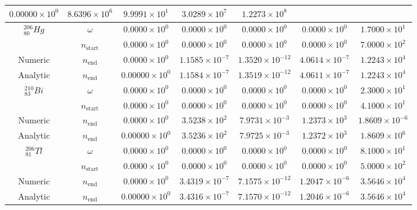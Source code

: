 \begin{table}[h]
\begin{center}
\begin{longtable}{c c c c c c c}
${0.00000} \times 10^{0}$ & ${8.6396} \times 10^{6}$ & ${9.9991} \times 10^{1}$ & 
${3.0289} \times 10^{7}$ & ${1.2273} \times 10^{8}$ \\
\hline
${}^{206}_{80}Hg$ & $\omega$ & 
${0.0000} \times 10^{0}$ & ${0.0000} \times 10^{0}$ & ${0.0000} \times 10^{0}$ &
${0.0000} \times 10^{0}$ & ${1.7000} \times 10^{1}$ \\
 & $n_{\text{start}}$ & 
${0.0000} \times 10^{0}$ & ${0.0000} \times 10^{0}$ & ${0.0000} \times 10^{0}$ &
${0.0000} \times 10^{0}$ & ${7.0000} \times 10^{2}$ \\
Numeric & $n_{\text{end}}$ & 
${0.0000} \times 10^{0}$ & ${1.1585} \times 10^{-7}$ & ${1.3520} \times 10^{-12}$ & 
${4.0614} \times 10^{-7}$ & ${1.2243} \times 10^{4}$ \\
Analytic & $n_{\text{end}}$ & 
${0.00000} \times 10^{0}$ & ${1.1584} \times 10^{-7}$ & ${1.3519} \times 10^{-12}$ & 
${4.0611} \times 10^{-7}$ & ${1.2243} \times 10^{4}$ \\
\hline
${}^{210}_{83}Bi$ & $\omega$ & 
${0.0000} \times 10^{0}$ & ${0.0000} \times 10^{0}$ & ${0.0000} \times 10^{0}$ &
${0.0000} \times 10^{0}$ & ${2.3000} \times 10^{1}$ \\
 & $n_{\text{start}}$ & 
${0.0000} \times 10^{0}$ & ${0.0000} \times 10^{0}$ & ${0.0000} \times 10^{0}$ &
${0.0000} \times 10^{0}$ & ${4.1000} \times 10^{1}$ \\
Numeric & $n_{\text{end}}$ & 
${0.0000} \times 10^{0}$ & ${3.5238} \times 10^{2}$ & ${7.9731} \times 10^{-3}$ & 
${1.2373} \times 10^{3}$ & ${1.8609} \times 10^{-6}$ \\
Analytic & $n_{\text{end}}$ & 
${0.00000} \times 10^{0}$ & ${3.5236} \times 10^{2}$ & ${7.9725} \times 10^{-3}$ & 
${1.2372} \times 10^{3}$ & ${1.8609} \times 10^{6}$ \\
\hline
${}^{206}_{81}Tl$ & $\omega$ & 
${0.0000} \times 10^{0}$ & ${0.0000} \times 10^{0}$ & ${0.0000} \times 10^{0}$ &
${0.0000} \times 10^{0}$ & ${8.1000} \times 10^{1}$ \\
 & $n_{\text{start}}$ & 
${0.0000} \times 10^{0}$ & ${0.0000} \times 10^{0}$ & ${0.0000} \times 10^{0}$ &
${0.0000} \times 10^{0}$ & ${5.0000} \times 10^{2}$ \\
Numeric & $n_{\text{end}}$ & 
${0.0000} \times 10^{0}$ & ${3.4319} \times 10^{-7}$ & ${7.1575} \times 10^{-12}$ & 
${1.2047} \times 10^{-6}$ & ${3.5646} \times 10^{4}$ \\
Analytic & $n_{\text{end}}$ & 
${0.00000} \times 10^{0}$ & ${3.4316} \times 10^{-7}$ & ${7.1570} \times 10^{-12}$ & 
${1.2046} \times 10^{-6}$ & ${3.5646} \times 10^{4}$ \\

\end{longtable}
\end{center}
\end{table}
